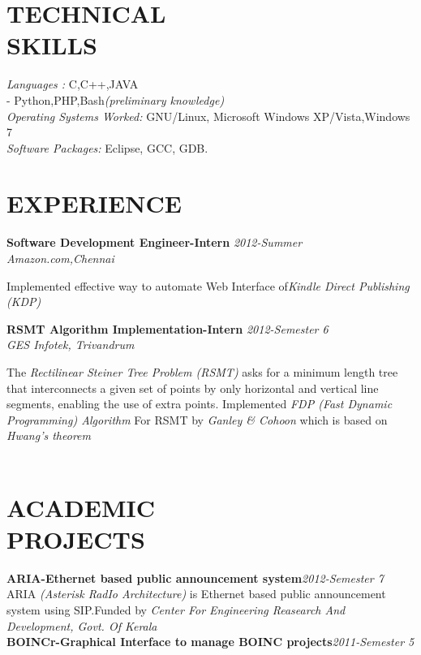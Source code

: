 \documentclass[line,margin]{res}
\begin{document}
\begin{resume}
	  \section{TECHNICAL \\ SKILLS} 
		  {\it Languages :} C,C++,JAVA\\-\hspace{15 mm} Python,PHP,Bash{\it (preliminary knowledge)}\\
		  {\it Operating Systems Worked:} GNU/Linux, Microsoft Windows XP/Vista,Windows 7\\
		  {\it Software Packages:} Eclipse, GCC, GDB.
		  
	   \section{EXPERIENCE}
		   {\bf Software Development Engineer-Intern }\hfill {\it 2012-Summer } \\
		   {\it Amazon.com,Chennai }
		   	   
				Implemented effective way to automate Web Interface of{\it Kindle Direct Publishing (KDP)}
				        
		   {\bf RSMT Algorithm Implementation-Intern }\hfill {\it 2012-Semester 6 } \\
		   {\it GES Infotek, Trivandrum }
		   
	           The {\it Rectilinear Steiner Tree Problem (RSMT)} asks for a minimum length tree that interconnects a given set of points by only horizontal and vertical line segments, enabling the use of extra points. Implemented {\it FDP (Fast Dynamic Programming) Algorithm } For RSMT by {\it Ganley \& Cohoon } which is based on {\it Hwang’s theorem}\\\\
	           
	    \section{ACADEMIC \\ PROJECTS}
	    	{\bf ARIA-Ethernet based public announcement system}\hfill {\it 2012-Semester 7}\\
	    
	    		ARIA {\it (Asterisk RadIo Architecture)} is Ethernet based public announcement system using SIP.Funded by {\it Center For Engineering Reasearch And Development, Govt. Of Kerala}\\
	
	    	{\bf BOINCr-Graphical Interface to manage BOINC projects}\hfill {\it 2011-Semester 5}\\
	

\end{resume}
\end{document}
